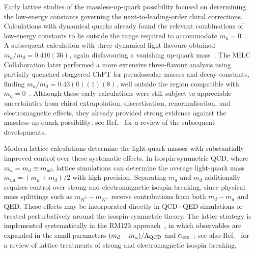 \documentclass[review]{elsarticle}
\numberwithin{equation}{section}
\numberwithin{table}{section}
\numberwithin{figure}{section}
\begin{document}
Early lattice studies of the massless-up-quark possibility focused on determining the low-energy constants governing the next-to-leading-order chiral corrections. Calculations with dynamical quarks already found the relevant combinations of low-energy constants to lie outside the range required to accommodate $m_u=0$~\cite{Irving:2001vy}. A subsequent calculation with three dynamical light flavours obtained $m_u/m_d=0.410(36)$, again disfavouring a vanishing up-quark mass~\cite{Nelson:2001bhq}. The MILC Collaboration later performed a more extensive three-flavour analysis using partially quenched staggered ChPT for pseudoscalar masses and decay constants, finding
$m_u/m_d=0.43(0)(1)(8)$, well outside the region compatible with $m_u=0$~\cite{MILC:2004qnl}. Although these early calculations were still subject to appreciable uncertainties from chiral extrapolation, discretisation, renormalisation, and electromagnetic effects, they already provided strong evidence against the massless-up-quark possibility; see Ref.~\cite{FlavourLatticeAveragingGroupFLAG:2024oxs} for a review of the subsequent developments.

Modern lattice calculations determine the light-quark masses with substantially improved control over these systematic effects. In isospin-symmetric QCD, where $m_u=m_d\equiv m_{ud}$, lattice simulations can determine the average light-quark mass $m_{ud}=(m_u+m_d)/2$ with high precision. Separating $m_u$ and $m_d$ additionally requires control over strong and electromagnetic isospin breaking, since physical mass splittings such as $m_{K^0}-m_{K^+}$ receive contributions from both $m_d-m_u$ and QED. These effects may be incorporated directly in QCD+QED simulations or treated perturbatively around the isospin-symmetric theory. The latter strategy is implemented systematically in the RM123 approach~\cite{deDivitiis:2013xla}, in which observables are expanded in the small parameters $(m_d-m_u)/\Lambda_{\rm QCD}$ and $\alpha_{\rm em}$~\cite{deDivitiis:2013xla,Giusti:2017dmp}; see also Ref.~\cite{FlavourLatticeAveragingGroupFLAG:2024oxs} for a review of lattice treatments of strong and electromagnetic isospin breaking.
\end{document}
